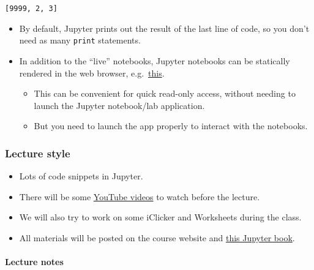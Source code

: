 \documentclass[11pt]{article}
\makeatletter
\providecommand{\tightlist}{%
      \setlength{\itemsep}{0pt}\setlength{\parskip}{0pt}}
\newcommand{\boxspacing}{\kern\kvtcb@left@rule\kern\kvtcb@boxsep}
\newcommand{\prompt}[4]{
        {\ttfamily\llap{{\color{#2}[#3]:\hspace{3pt}#4}}\vspace{-\baselineskip}}
    }
\makeatother
\begin{document}
            \begin{tcolorbox}[breakable, size=fbox, boxrule=.5pt, pad at break*=1mm, opacityfill=0]
\prompt{Out}{outcolor}{18}{\boxspacing}
\begin{Verbatim}[commandchars=\\\{\}]
[9999, 2, 3]
\end{Verbatim}
\end{tcolorbox}
        
    \begin{itemize}
\tightlist
\item
  By default, Jupyter prints out the result of the last line of code, so
  you don't need as many \texttt{print} statements.
\item
  In addition to the ``live'' notebooks, Jupyter notebooks can be
  statically rendered in the web browser,
  e.g.~\href{https://github.com/UBC-CS/cpsc330-2023W1/blob/master/lectures/01_intro.ipynb}{this}.

  \begin{itemize}
  \tightlist
  \item
    This can be convenient for quick read-only access, without needing
    to launch the Jupyter notebook/lab application.
  \item
    But you need to launch the app properly to interact with the
    notebooks.
  \end{itemize}
\end{itemize}

    \subsubsection{Lecture style}\label{lecture-style}

\begin{itemize}
\tightlist
\item
  Lots of code snippets in Jupyter.
\item
  There will be some
  \href{https://www.youtube.com/channel/UC40oUwJPrUmhsYdURk8OjqA}{YouTube
  videos} to watch before the lecture.
\item
  We will also try to work on some iClicker and Worksheets during the
  class.
\item
  All materials will be posted on the course website and
  \href{https://ubc-cs.github.io/cpsc330-2023W2}{this Jupyter book}.
\end{itemize}

    \paragraph{Lecture notes}\label{lecture-notes}
\end{document}
